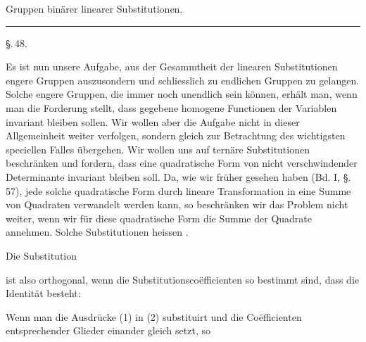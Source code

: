 
\begin{center}

Gruppen bin\"arer linearer Substitutionen.

\rule{4cm}{0.4pt}

\S.\,48.

\end{center}

Es ist nun unsere Aufgabe, aus der Gesammtheit der linearen
Substitutionen engere Gruppen auszusondern und schliesslich
zu endlichen Gruppen zu gelangen. Solche engere Gruppen, die
immer noch unendlich sein k\"onnen, erh\"alt man, wenn man die
Forderung stellt, dass gegebene homogene Functionen der
Variablen invariant bleiben sollen. Wir wollen aber die Aufgabe
nicht in dieser Allgemeinheit weiter verfolgen, sondern gleich
zur Betrachtung des wichtigsten speciellen Falles \"ubergehen. Wir
wollen uns auf tern\"are Substitutionen beschr\"anken und fordern,
dass eine quadratische Form von nicht verschwindender Determinante invariant bleiben soll. Da, wie wir fr\"uher gesehen
haben (Bd. I, \S.\,57), jede solche quadratische Form durch lineare
Transformation in eine Summe von Quadraten verwandelt werden
kann, so beschr\"anken wir das Problem nicht weiter, wenn wir
f\"ur diese quadratische Form die Summe der Quadrate annehmen.
Solche Substitutionen heissen .

Die Substitution


ist also orthogonal, wenn die Substitutionscoëfficienten so bestimmt sind, dass die Identit\"at besteht:


Wenn man die Ausdr\"ucke (1) in (2) substituirt und die
Coëfficienten entsprechender Glieder einander gleich setzt, so
